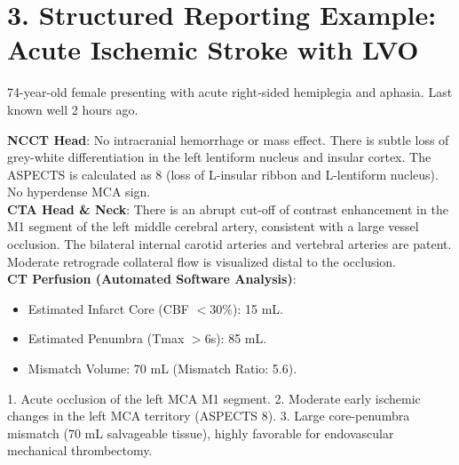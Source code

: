 \section*{3. Structured Reporting Example: Acute Ischemic Stroke with LVO}

\begin{testbox}[Indications:]
74-year-old female presenting with acute right-sided hemiplegia and aphasia. Last known well 2 hours ago.
\end{testbox}
\begin{refbox}[Findings:]
\textbf{NCCT Head}: No intracranial hemorrhage or mass effect. There is subtle loss of grey-white differentiation in the left lentiform nucleus and insular cortex. The ASPECTS is calculated as 8 (loss of L-insular ribbon and L-lentiform nucleus). No hyperdense MCA sign.\\
\textbf{CTA Head \& Neck}: There is an abrupt cut-off of contrast enhancement in the M1 segment of the left middle cerebral artery, consistent with a large vessel occlusion. The bilateral internal carotid arteries and vertebral arteries are patent. Moderate retrograde collateral flow is visualized distal to the occlusion.\\
\textbf{CT Perfusion (Automated Software Analysis)}:
\begin{itemize}
    \item Estimated Infarct Core (CBF $< 30\%$): 15 mL.
    \item Estimated Penumbra (Tmax $> 6$s): 85 mL.
    \item Mismatch Volume: 70 mL (Mismatch Ratio: 5.6).
\end{itemize}
\end{refbox}
\begin{pearlbox}[Impression:]
1. Acute occlusion of the left MCA M1 segment.
2. Moderate early ischemic changes in the left MCA territory (ASPECTS 8).
3. Large core-penumbra mismatch (70 mL salvageable tissue), highly favorable for endovascular mechanical thrombectomy.
\end{pearlbox}

\clearpage
